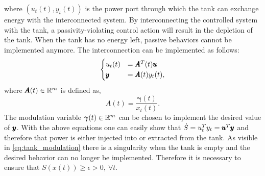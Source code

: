 where $(u_t(t), y_t(t))$ is the power port through which the tank can exchange energy with the interconnected system. By interconnecting the controlled system with the tank, a passivity-violating control action will result in the depletion of the tank. When the tank has no energy left, passive behaviors cannot be implemented anymore. The interconnection can be implemented as follows:
\begin{equation}
\begin{cases}
    u_t(t) &= \pmb{A}^T(t) \pmb{u} \\
    \pmb{y} &= \pmb{A}(t) y_t(t),
\end{cases}
\end{equation}
where $\pmb{A}(t) \in \mathbb{R}^{m}$ is defined as,
\begin{equation} \label{eq:tank_modulation}
    A(t) = \frac{\boldsymbol{\gamma}(t)}{x_t(t)}.
\end{equation}
The modulation variable $\boldsymbol{\gamma}(t) \in \mathbb{R}^{m}$ can be chosen to implement the desired value of $\pmb{y}$. With the above equations one can easily show that $\dot{S} = u_t^T y_t = \pmb{u}^T \pmb{y}$ and therefore that power is either injected into or extracted from the tank. As visible in \eqref{eq:tank_modulation} there is a singularity when the tank is empty and the desired behavior can no longer be implemented. 
Therefore it is necessary to ensure that $S(x(t)) \geq \epsilon > 0, \ \forall t$.
